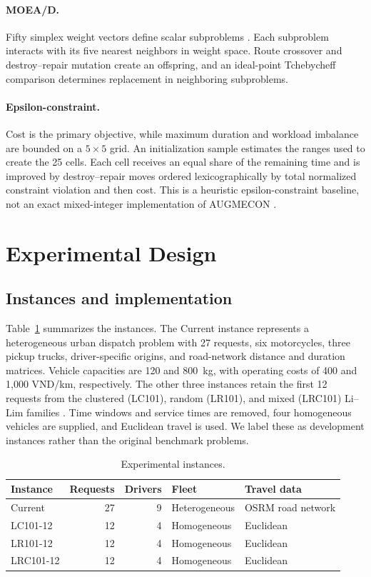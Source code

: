 \documentclass[11pt,a4paper]{article}
\begin{document}
\paragraph{MOEA/D.} Fifty simplex weight vectors define scalar subproblems \cite{zhang2007moead}. Each subproblem interacts with its five nearest neighbors in weight space. Route crossover and destroy--repair mutation create an offspring, and an ideal-point Tchebycheff comparison determines replacement in neighboring subproblems.

\paragraph{Epsilon-constraint.} Cost is the primary objective, while maximum duration and workload imbalance are bounded on a $5\times5$ grid. An initialization sample estimates the ranges used to create the 25 cells. Each cell receives an equal share of the remaining time and is improved by destroy--repair moves ordered lexicographically by total normalized constraint violation and then cost. This is a heuristic epsilon-constraint baseline, not an exact mixed-integer implementation of AUGMECON \cite{mavrotas2009epsilon}.

\section{Experimental Design}

\subsection{Instances and implementation}

Table~\ref{tab:instances} summarizes the instances. The Current instance represents a heterogeneous urban dispatch problem with 27 requests, six motorcycles, three pickup trucks, driver-specific origins, and road-network distance and duration matrices. Vehicle capacities are 120 and 800~kg, with operating costs of 400 and 1,000 VND/km, respectively. The other three instances retain the first 12 requests from the clustered (LC101), random (LR101), and mixed (LRC101) Li--Lim families \cite{li2003metaheuristic}. Time windows and service times are removed, four homogeneous vehicles are supplied, and Euclidean travel is used. We label these as development instances rather than the original benchmark problems.

\begin{table}[tbp]
\centering
\caption{Experimental instances.}
\label{tab:instances}
\begin{tabular}{lrrll}
\toprule
Instance & Requests & Drivers & Fleet & Travel data \\
\midrule
Current & 27 & 9 & Heterogeneous & OSRM road network \\
LC101-12 & 12 & 4 & Homogeneous & Euclidean \\
LR101-12 & 12 & 4 & Homogeneous & Euclidean \\
LRC101-12 & 12 & 4 & Homogeneous & Euclidean \\
\bottomrule
\end{tabular}
\end{table}
\end{document}
